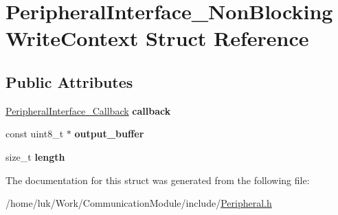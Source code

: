 \hypertarget{structPeripheralInterface__NonBlockingWriteContext}{}\section{Peripheral\+Interface\+\_\+\+Non\+Blocking\+Write\+Context Struct Reference}
\label{structPeripheralInterface__NonBlockingWriteContext}
\subsection*{Public Attributes}
\begin{DoxyCompactItemize}
\item 
\mbox{\label{structPeripheralInterface__NonBlockingWriteContext_a862fd22f532ac1eafd36125c482e4b99}} 
\mbox{\hyperlink{structCommunicationModule__Callback}{Peripheral\+Interface\+\_\+\+Callback}} {\bfseries callback}
\item 
\mbox{\label{structPeripheralInterface__NonBlockingWriteContext_a2fa20a3b00816647de208c22926359f8}} 
const uint8\+\_\+t $\ast$ {\bfseries output\+\_\+buffer}
\item 
\mbox{\label{structPeripheralInterface__NonBlockingWriteContext_a9b49470b76653f90dab05c00ce27728a}} 
size\+\_\+t {\bfseries length}
\end{DoxyCompactItemize}


The documentation for this struct was generated from the following file\+:\begin{DoxyCompactItemize}
\item 
/home/luk/\+Work/\+Communication\+Module/include/\mbox{\hyperlink{Peripheral_8h}{Peripheral.\+h}}\end{DoxyCompactItemize}
